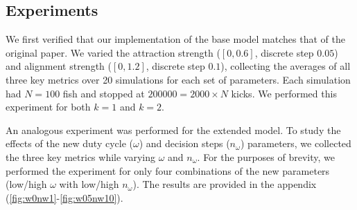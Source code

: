 


\subsection{Experiments}

We first verified that our implementation of the base model matches that of the original paper.
We varied the attraction strength ($[0, 0.6]$, discrete step $0.05$) and alignment strength ($[0, 1.2]$, discrete step $0.1$), collecting the averages of all three key metrics over 20 simulations for each set of parameters.
Each simulation had $N=100$ fish and stopped at $200000 = 2000 \times N$ kicks.
We performed this experiment for both $k=1$ and $k=2$.

An analogous experiment was performed for the extended model.
To study the effects of the new duty cycle ($\omega$) and decision steps ($n_\omega$) parameters,
we collected the three key metrics while varying $\omega$ and $n_\omega$.
For the purposes of brevity, we performed the experiment for only four combinations of the new parameters (low/high $\omega$ with low/high $n_\omega$).
The results are provided in the appendix (\ref{fig:w0nw1}-\ref{fig:w05nw10}).

